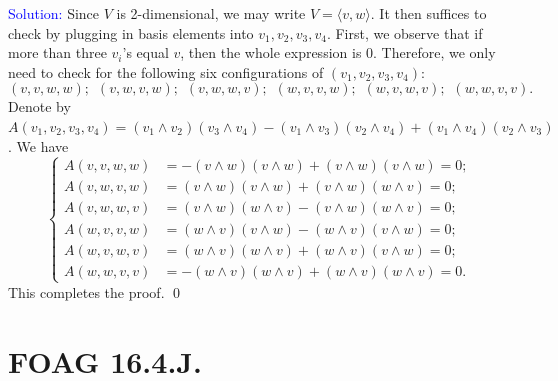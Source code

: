 \documentclass[11pt]{article}
\newenvironment{solution}{\begin{trivlist}\item[]{\textcolor{blue}{Solution:}}}{\qed \end{trivlist}}
\begin{document}
\begin{solution}
    Since $V$ is 2-dimensional, we may write $V = \langle v, w \rangle$. It then suffices to check by plugging in basis elements into $v_1, v_2, v_3, v_4$. First, we observe that if more than three $v_i$'s equal $v$, then the whole expression is 0. Therefore, we only need to check for the following six configurations of $(v_1, v_2, v_3, v_4)$:
	\begin{equation*}
		(v, v, w, w); \hspace{5pt}
		(v, w, v, w); \hspace{5pt}
		(v, w, w, v); \hspace{5pt}
		(w, v, v, w); \hspace{5pt}
		(w, v, w, v); \hspace{5pt}
		(w, w, v, v).
	\end{equation*}
	Denote by $A(v_1, v_2, v_3, v_4) = (v_1 \wedge v_2) (v_3 \wedge v_4) - (v_1 \wedge v_3) (v_2 \wedge v_4) + (v_1 \wedge v_4) (v_2 \wedge v_3)$. 
	We have 
	\begin{equation*}
		\begin{cases}
			A(v, v, w, w) &= 
			- (v \wedge w) (v \wedge w) + (v \wedge w) (v \wedge w) = 0 ; \\
			A(v, w, v, w) &= 
			(v \wedge w) (v \wedge w) + (v \wedge w) (w \wedge v) = 0 ; \\
			A(v, w, w, v) &= 
			(v \wedge w) (w \wedge v) - (v \wedge w) (w \wedge v) = 0 ; \\
			A(w, v, v, w) &= 
			(w \wedge v) (v \wedge w) - (w \wedge v) (v \wedge w) = 0 ; \\
			A(w, v, w, v) &=
			(w \wedge v) (w \wedge v) + (w \wedge v) (v \wedge w) = 0 ; \\
			A(w, w, v, v) &= 
			- (w \wedge v) (w \wedge v) + (w \wedge v) (w \wedge v) = 0 .
		\end{cases}
	\end{equation*}
	This completes the proof. 
\end{solution}

\newpage

\section*{FOAG 16.4.J.}
\end{document}

